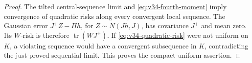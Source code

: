 \begin{proof}
The tilted central-sequence limit and \eqref{eq:v34-fourth-moment} imply
convergence of quadratic risks along every convergent local sequence.
The Gaussian error \(J^+Z-\Pi h\), for
\(Z\sim N(Jh,J)\), has covariance \(J^+\) and mean zero.
Its \(W\)-risk is therefore \(\operatorname{tr}(WJ^+)\).
If \eqref{eq:v34-quadratic-risk} were not uniform on \(K\), a violating
sequence would have a convergent subsequence in \(K\), contradicting the
just-proved sequential limit.  This proves the compact-uniform assertion.
\end{proof}

